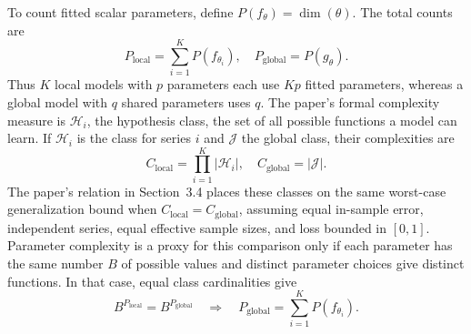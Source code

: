 \documentclass[12pt,a4paper]{article}
\numberwithin{equation}{section}
\numberwithin{table}{section}
\numberwithin{figure}{section}
\begin{document}
To count fitted scalar parameters, define $P(f_{\theta})=\dim(\theta)$. The total counts are
\begin{equation}\label{eq:local-global-parameters}
P_{\mathrm{local}}=\sum_{i=1}^{K}P(f_{\theta_i}),\quad
P_{\mathrm{global}}=P(g_{\theta}).
\end{equation}
Thus $K$ local models with $p$ parameters each use $Kp$ fitted parameters, whereas a global model with $q$ shared parameters uses $q$. The paper's formal complexity measure is $\mathcal H_i$, the hypothesis class, the set of all possible functions a model can learn. If $\mathcal H_i$ is the class for series $i$ and $\mathcal J$ the global class, their complexities are
\begin{equation}\label{eq:local-global-complexity}
C_{\mathrm{local}}=\prod_{i=1}^{K}|\mathcal H_i|,\quad
C_{\mathrm{global}}=|\mathcal J|.
\end{equation}
The paper's relation in Section~3.4 places these classes on the same worst-case generalization bound when $C_{\mathrm{local}}=C_{\mathrm{global}}$, assuming equal in-sample error, independent series, equal effective sample sizes, and loss bounded in $[0,1]$. Parameter complexity is a proxy for this comparison only if each parameter has the same number $B$ of possible values and distinct parameter choices give distinct functions. In that case, equal class cardinalities give \cite{monteromanso2021}
\begin{equation}\label{eq:local-global-equal-count}
B^{P_{\mathrm{local}}}=B^{P_{\mathrm{global}}}
\quad\Longrightarrow\quad
P_{\mathrm{global}}=\sum_{i=1}^{K}P(f_{\theta_i}).
\end{equation}
\end{document}

